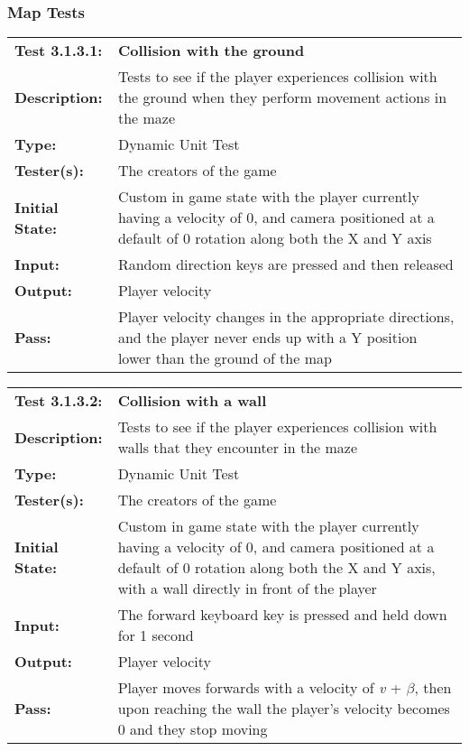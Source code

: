 \documentclass[12pt, titlepage]{article}
\begin{document}
\begin{enumerate}
\subsubsection{Map Tests}
\begin{mdframed}[linewidth=1pt]
\begin{tabularx}{\textwidth}{@{}p{3cm}X@{}}
{\bf Test 3.1.3.1:} & {\bf Collision with the ground}\\[\baselineskip]
{\bf Description:} & Tests to see if the player experiences collision with the ground when they perform movement actions in the maze\\[0.5\baselineskip]
{\bf Type:} & Dynamic Unit Test\\[0.5\baselineskip]
{\bf Tester(s):} & The creators of the game\\[0.5\baselineskip]
{\bf Initial State:} & Custom in game state with the player currently having a velocity of 0, and camera positioned at a default of 0 rotation along both the X and Y axis\\[0.5\baselineskip]
{\bf Input:} & Random direction keys are pressed and then released \\[0.5\baselineskip]
{\bf Output:} & Player velocity\\[0.5\baselineskip]
{\bf Pass:} & Player velocity changes in the appropriate directions, and the player never ends up with a Y position lower than the ground of the map
\end{tabularx}
\end{mdframed}

\begin{mdframed}[linewidth=1pt]
\begin{tabularx}{\textwidth}{@{}p{3cm}X@{}}
{\bf Test 3.1.3.2:} & {\bf Collision with a wall}\\[\baselineskip]
{\bf Description:} & Tests to see if the player experiences collision with walls that they encounter in the maze\\[0.5\baselineskip]
{\bf Type:} & Dynamic Unit Test\\[0.5\baselineskip]
{\bf Tester(s):} & The creators of the game\\[0.5\baselineskip]
{\bf Initial State:} & Custom in game state with the player currently having a velocity of 0, and camera positioned at a default of 0 rotation along both the X and Y axis, with a wall directly in front of the player\\[0.5\baselineskip]
{\bf Input:} & The forward keyboard key is pressed and held down for 1 second \\[0.5\baselineskip]
{\bf Output:} & Player velocity\\[0.5\baselineskip]
{\bf Pass:} & Player moves forwards with a velocity of \textit{v} + $\beta$, then upon reaching the wall the player's velocity becomes 0 and they stop moving
\end{tabularx}
\end{mdframed}


\end{enumerate}
\end{document}
